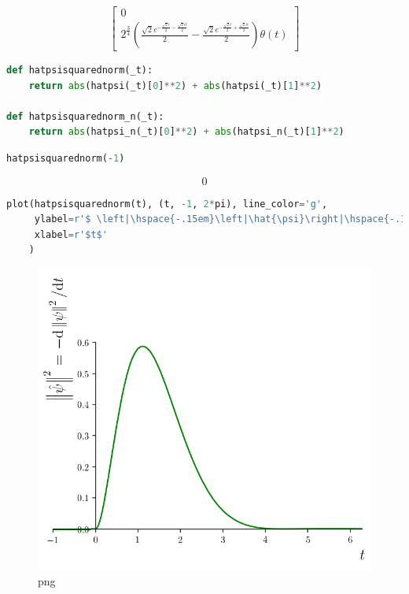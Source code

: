 \begin{equation}\label{eq:sympy:hatpsi}
    \left[\begin{matrix}0\\2^{\frac{3}{4}} \left(\frac{\sqrt{2} e^{- \frac{\sqrt{2} t}{2} - \frac{\sqrt{2} i t}{2}}}{2} - \frac{\sqrt{2} e^{- \frac{\sqrt{2} t}{2} + \frac{\sqrt{2} i t}{2}}}{2}\right) \theta\left(t\right)\end{matrix}\right]
\end{equation}

\begin{lstlisting}[language=Python]
def hatpsisquarednorm(_t):
    return abs(hatpsi(_t)[0]**2) + abs(hatpsi(_t)[1]**2)

def hatpsisquarednorm_n(_t):
    return abs(hatpsi_n(_t)[0]**2) + abs(hatpsi_n(_t)[1]**2)
\end{lstlisting}

\begin{lstlisting}[language=Python]
hatpsisquarednorm(-1)
\end{lstlisting}

\[0\]

\begin{lstlisting}[language=Python]
plot(hatpsisquarednorm(t), (t, -1, 2*pi), line_color='g',
     ylabel=r'$ \left|\hspace{-.15em}\left|\hat{\psi}\right|\hspace{-.15em}\right|^2 $ =  $ - \mathrm{d}\left|\hspace{-0.15em}\left|\psi\right|\hspace{-0.15em}\right|^2 / \mathrm{d}t $',
     xlabel=r'$t$'
    )
\end{lstlisting}

\begin{figure}
\centering
\includegraphics[width=0.6\linewidth]{output_51_0.png}
\caption{png}
\end{figure}


